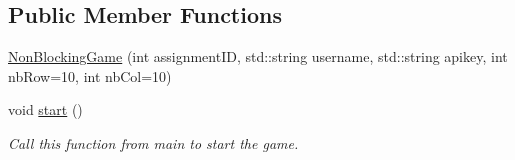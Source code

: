 \subsection*{Public Member Functions}
\begin{DoxyCompactItemize}
\item 
\hyperlink{classbridges_1_1game_1_1_non_blocking_game_a3226aa7e7ff129e916f4bd5aabcb2e72}{Non\+Blocking\+Game} (int assignment\+ID, std\+::string username, std\+::string apikey, int nb\+Row=10, int nb\+Col=10)
\item 
void \hyperlink{classbridges_1_1game_1_1_non_blocking_game_ab48a0d690368bb8ff7b02aad0b6f336e}{start} ()
\begin{DoxyCompactList}\small\item\em Call this function from main to start the game. \end{DoxyCompactList}\end{DoxyCompactItemize}
